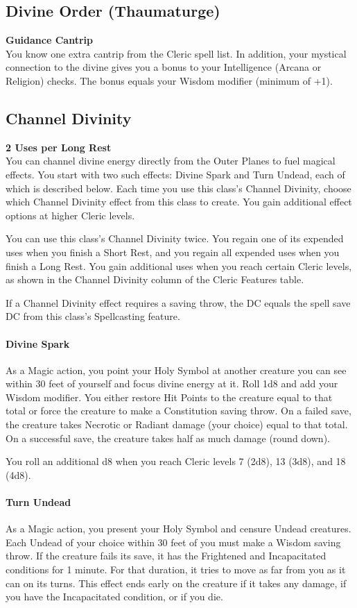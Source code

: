 \documentclass[letterpaper,openany,oneside,twocolumn]{book}
\begin{document}
\subsection*{Divine Order (Thaumaturge)}
\textbf{Guidance Cantrip}\\
You know one extra cantrip from the Cleric spell list. In addition, your mystical connection to the divine gives you a bonus to your Intelligence (Arcana or Religion) checks. The bonus equals your Wisdom modifier (minimum of +1).
\subsection*{Channel Divinity}
\textbf{2 Uses per Long Rest}\\
You can channel divine energy directly from the Outer Planes to fuel magical effects. You start with two such effects: Divine Spark and Turn Undead, each of which is described below. Each time you use this class's Channel Divinity, choose which Channel Divinity effect from this class to create. You gain additional effect options at higher Cleric levels.

You can use this class's Channel Divinity twice. You regain one of its expended uses when you finish a Short Rest, and you regain all expended uses when you finish a Long Rest. You gain additional uses when you reach certain Cleric levels, as shown in the Channel Divinity column of the Cleric Features table.

If a Channel Divinity effect requires a saving throw, the DC equals the spell save DC from this class's Spellcasting feature.

\paragraph*{Divine Spark} As a Magic action, you point your Holy Symbol at another creature you can see within 30 feet of yourself and focus divine energy at it. Roll 1d8 and add your Wisdom modifier. You either restore Hit Points to the creature equal to that total or force the creature to make a Constitution saving throw. On a failed save, the creature takes Necrotic or Radiant damage (your choice) equal to that total. On a successful save, the creature takes half as much damage (round down).

You roll an additional d8 when you reach Cleric levels 7 (2d8), 13 (3d8), and 18 (4d8).

\paragraph*{Turn Undead} As a Magic action, you present your Holy Symbol and censure Undead creatures. Each Undead of your choice within 30 feet of you must make a Wisdom saving throw. If the creature fails its save, it has the Frightened and Incapacitated conditions for 1 minute. For that duration, it tries to move as far from you as it can on its turns. This effect ends early on the creature if it takes any damage, if you have the Incapacitated condition, or if you die.
\end{document}
